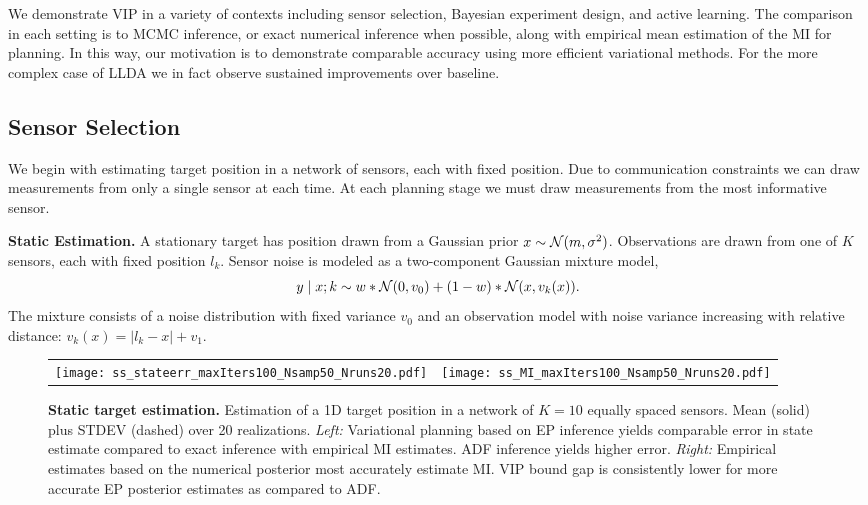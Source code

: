 We demonstrate VIP in a variety of contexts including sensor
selection, Bayesian experiment design, and active learning.  The
comparison in each setting is to MCMC inference, or exact numerical
inference when possible, along with empirical mean estimation of the
MI for planning.  In this way, our motivation is to demonstrate
comparable accuracy using more efficient variational methods.  For the
more complex case of LLDA we in fact observe sustained improvements
over baseline.

\subsection{Sensor Selection}

We begin with estimating target position in a network of sensors, each
with fixed position.  Due to communication constraints we can draw
measurements from only a single sensor at each time.  At each planning
stage we must draw measurements from the most informative sensor.


\textbf{Static Estimation.}  A stationary target has position drawn
from a Gaussian prior $x \sim \mathcal{N}(m,\sigma^2)$.  Observations are
drawn from one of $K$ sensors, each with fixed position $l_k$.  Sensor
noise is modeled as a two-component Gaussian mixture model,
\[
  y \mid x; k \sim w * \mathcal{N}(0, v_0) + (1-w) * \mathcal{N}(x, v_k(x)).
\]
The mixture consists of a noise distribution with fixed variance $v_0$
and an observation model with noise variance increasing with relative
distance: \mbox{$v_k(x) = |l_k - x| + v_1$}.

\begin{figure}
  \begin{tabular}{cc}
    \hspace{-3mm}\texttt{[image: ss\_stateerr\_maxIters100\_Nsamp50\_Nruns20.pdf]} &
    \hspace{-5mm}\texttt{[image: ss\_MI\_maxIters100\_Nsamp50\_Nruns20.pdf]}
  \end{tabular}
  
  \caption{\small\textbf{Static target estimation.} Estimation of a 1D
    target position in a network of $K=10$ equally spaced sensors.
    Mean (solid) plus STDEV (dashed) over 20 realizations.  \emph{Left:}
    Variational planning based on EP inference yields comparable error
    in state estimate compared to exact inference with empirical MI
    estimates. ADF inference yields higher error.  \emph{Right:}
    Empirical estimates based on the numerical posterior most
    accurately estimate MI.  VIP bound gap is consistently lower for
    more accurate EP posterior estimates as compared to
    ADF.}  \label{fig:static}
\end{figure}

